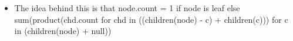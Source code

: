 \documentclass[11pt]{article}
\begin{document}
\begin{solution}
    \begin{itemize}
        \item The idea behind this is that 
            node.count = 1 if node is leaf else sum(product(chd.count for chd in ((children(node) - {c}) + children(c))) for c in (children(node) + null))
    \end{itemize}
\end{solution}
\end{document}
